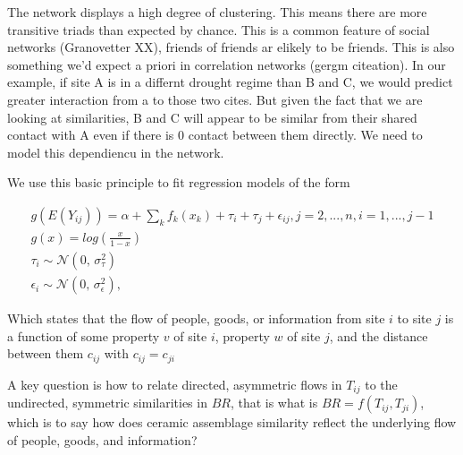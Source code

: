 \documentclass[11pt]{wlscirep}
\begin{document}
The network displays a high degree of clustering. This means there are more transitive triads than expected by chance. This is a common feature of social networks (Granovetter XX), friends of friends ar elikely to be friends. This is also something we'd expect a priori in correlation networks (gergm citeation). In our example, if site A is in a differnt drought regime than B and C, we would predict greater interaction from a to those two cites. But given the fact that we are looking at similarities, B and C will appear to be similar from their shared contact with A even if there is 0 contact between them directly. We need to model this dependiencu in the network.

We use this basic principle to fit regression models of the form

\begin{equation}
\begin{split}
    g(E(Y_{ij})) = \alpha + \sum_k f_k(x_k) + \tau_i + \tau_j + \epsilon_{ij}, j = 2, ..., n, i = 1, ..., j - 1\\
    g(x) = log(\frac{x}{1-x})\\
    \tau_i \sim \mathcal{N}(0,\,\sigma^{2}_{\tau})\\
    \epsilon_i \sim \mathcal{N}(0,\,\sigma^{2}_{\epsilon}),
\end{split}
\end{equation}


Which states that the flow of people, goods, or information from site $i$ to site $j$ is a function of some property $v$ of site $i$, property $w$ of site $j$, and the distance between them $c_{ij}$ with $c_{ij} = c_{ji}$

A key question is how to relate directed, asymmetric flows in $T_{ij}$ to the undirected, symmetric similarities in $BR$, that is what is $BR = f(T_{ij},T_{ji})$, which is to say how does ceramic assemblage similarity reflect the underlying flow of people, goods, and information?
\end{document}
